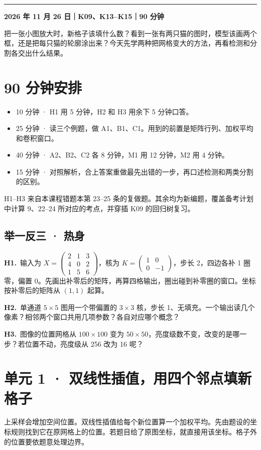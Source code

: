 \documentclass[UTF8,a4paper,11pt]{ctexart}
\newcommand{\chaptertitle}[1]{\Needspace{8\baselineskip}\noindent{\LARGE\bfseries\sffamily #1}\par\vspace{4mm}\hrule\vspace{6mm}}
\newcommand{\CompactQuestion}[2]{\par\noindent\textbf{#1.}\ #2\par\vspace{.8em}}
\begin{document}
\chaptertitle{第 12 天 · 上采样、检测与分割}
\textbf{2026 年 11 月 26 日｜K09、K13–K15｜90 分钟}

把一张小图放大时，新格子该填什么数？看到一张有两只猫的图时，模型该画两个框，还是把每只猫的轮廓涂出来？今天先学两种把网格变大的方法，再看检测和分割各交出什么结果。

\section{90 分钟安排}
\begin{itemize}
\item 10 分钟 · H1 用 5 分钟，H2 和 H3 用余下 5 分钟口答。
\item 25 分钟 · 读三个例题，做 A1、B1、C1。用到的前置是矩阵行列、加权平均和卷积窗口。
\item 40 分钟 · A2、B2、C2 各 8 分钟，M1 用 12 分钟，M2 用 4 分钟。
\item 15 分钟 · 对照解析，合上答案重做最先出错的一步，再口述检测和两类分割的区别。
\end{itemize}
H1–H3 来自本课程错题本第 23–25 条的复做题。其余均为新编题，覆盖备考计划中计算 9、22–24 所对应的考点，并穿插 K09 的回归树复习。

\subsection{举一反三 · 热身}
\CompactQuestion{H1}{输入为 $X=\begin{pmatrix}2&1&3\\4&0&2\\1&5&6\end{pmatrix}$，核为 $K=\begin{pmatrix}1&0\\0&-1\end{pmatrix}$，步长 2，四边各补 1 圈零，偏置 0。先画出补零后的矩阵，再算四格输出，圈出碰到补零圈的窗口。坐标按补零后的矩阵从 $(1,1)$ 起算。}
\CompactQuestion{H2}{单通道 $5\times5$ 图用一个带偏置的 $3\times3$ 核，步长 1、无填充。一个输出读几个像素？相邻两个窗口共用几项参数？各自对应哪个概念？}
\CompactQuestion{H3}{图像的位置网格从 $100\times100$ 变为 $50\times50$，亮度级数不变，改变的是哪一步？若位置不动，亮度级从 256 改为 16 呢？}
\clearpage
\section{单元 1 · 双线性插值，用四个邻点填新格子}
上采样会增加空间位置。双线性插值给每个新位置算一个加权平均。先由题设的坐标规则找到它在原网格上的位置。若题目给了原图坐标，就直接用该坐标。格子外的位置要依题意处理边界。
\end{document}
